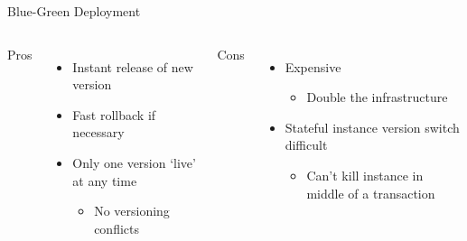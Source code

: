 \documentclass{slide}
\begin{document}
\begin{frame}{Blue-Green Deployment}
    \vspace{1pt}
    \begin{columns}[t]
      \huge Pros
      {\LARGE
        \begin{itemize}
            \item { Instant release of new version\\}
            \item Fast rollback if necessary
            \vspace{1mm}
            \item { Only one version `live' at any time\\}
            \begin{itemize}
                \Large\item No versioning conflicts
            \end{itemize}
        \end{itemize}
      }
      \huge Cons
      {\LARGE
        \vspace{3mm}
        \begin{itemize}
            \item Expensive
            \begin{itemize}
                \Large\item Double the infrastructure
            \end{itemize}
            \vspace{1mm}
            \item { Stateful instance version switch difficult\\}
            \begin{itemize}
                \Large\item Can't kill instance in middle of a transaction
            \end{itemize}
        \end{itemize}
      }
    \end{columns}
\end{frame}
\end{document}
